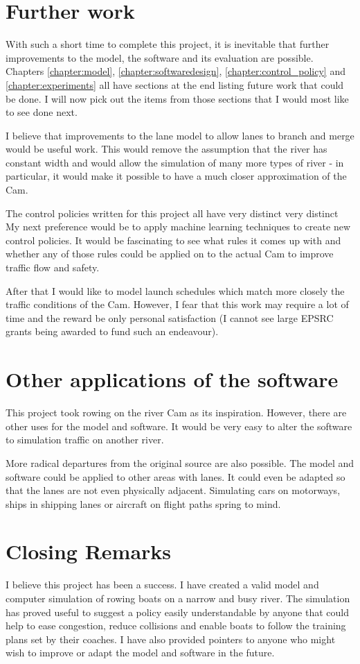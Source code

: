   \section{Further work}
  With such a short time to complete this project, it is inevitable that further improvements to the model, the software and its evaluation are possible. Chapters \ref{chapter:model}, \ref{chapter:softwaredesign}, \ref{chapter:control_policy} and \ref{chapter:experiments} all have sections at the end listing future work that could be done. I will now pick out the items from those sections that I would most like to see done next.
  
  I believe that improvements to the lane model to allow lanes to branch and merge would be useful work. This would remove the assumption that the river has constant width and would allow the simulation of many more types of river - in particular, it would make it possible to have a much closer approximation of the Cam.
  
  The control policies written for this project all have very distinct  very distinct My next preference would be to apply machine learning techniques to create new control policies. It would be fascinating to see what rules it comes up with and whether any of those rules could be applied on to the actual Cam to improve traffic flow and safety.
  
  After that I would like to model launch schedules which match more closely the traffic conditions of the Cam. However, I fear that this work may require a lot of time and the reward be only personal satisfaction (I cannot see large EPSRC grants being awarded to fund such an endeavour).
  
  \section{Other applications of the software}
  This project took rowing on the river Cam as its inspiration. However, there are other uses for the model and software. It would be very easy to alter the software to simulation traffic on another river.
  
  More radical departures from the original source are also possible. The model and software could be applied to other areas with lanes. It could even be adapted so that the lanes are not even physically adjacent. Simulating cars on motorways, ships in shipping lanes or aircraft on flight paths spring to mind.

  \section{Closing Remarks}
  I believe this project has been a success. I have created a valid model and computer simulation of rowing boats on a narrow and busy river. The simulation has proved useful to suggest a policy easily understandable by anyone that could help to ease congestion, reduce collisions and enable boats to follow the training plans set by their coaches. I have also provided pointers to anyone who might wish to improve or adapt the model and software in the future.

  